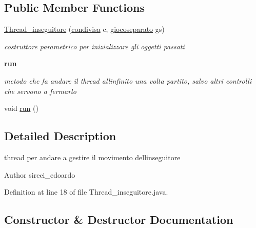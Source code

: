 \subsection*{Public Member Functions}
\begin{DoxyCompactItemize}
\item 
\hyperlink{classcargame_1_1_thread__inseguitore_a6c959deeda827916ca57ac7b597b16d5}{Thread\+\_\+inseguitore} (\hyperlink{classcargame_1_1condivisa}{condivisa} c, \hyperlink{classcargame_1_1giocoseparato}{giocoseparato} gs)
\begin{DoxyCompactList}\small\item\em costruttore parametrico per inizializzare gli oggetti passati \end{DoxyCompactList}\end{DoxyCompactItemize}
\begin{Indent}\textbf{ run}\par
{\em metodo che fa andare il thread all\textquotesingle{}infinito una volta partito, salvo altri controlli che servono a fermarlo }\begin{DoxyCompactItemize}
\item 
void \hyperlink{classcargame_1_1_thread__inseguitore_a13a43e6d814de94978c515cb084873b1}{run} ()
\end{DoxyCompactItemize}
\end{Indent}


\subsection{Detailed Description}
thread per andare a gestire il movimento dell\textquotesingle{}inseguitore 

\begin{DoxyAuthor}{Author}
sireci\+\_\+edoardo 
\end{DoxyAuthor}


Definition at line 18 of file Thread\+\_\+inseguitore.\+java.



\subsection{Constructor \& Destructor Documentation}
\mbox{\label{classcargame_1_1_thread__inseguitore_a6c959deeda827916ca57ac7b597b16d5}} 
